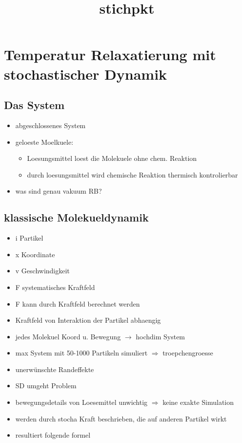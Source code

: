 \documentclass[]{article}
\title{stichpkt}
\begin{document}
\section{Temperatur Relaxatierung mit stochastischer Dynamik}

\subsection{Das System}
\begin{itemize}
	\item abgeschlossenes System
	\item geloeste Moelkuele: 
	\begin{itemize}
		\item Loesungsmittel loest die Molekuele ohne chem. Reaktion
		\item durch loesungsmittel wird chemische Reaktion thermisch kontrolierbar
	\end{itemize}	
	\item was sind genau vakuum RB? %
\end{itemize}

\subsection{klassische Molekueldynamik}
\begin{itemize}
	\item i Partikel
	\item x Koordinate 
	\item v Geschwindigkeit
	\item F systematisches Kraftfeld
	\item F kann durch Kraftfeld berechnet werden
	\item Kraftfeld von Interaktion der Partikel abhaengig
	\item jedes Molekuel Koord u. Bewegung $\rightarrow$ hochdim System 
	\item max System mit 50-1000 Partikeln simuliert $\Rightarrow $ troepchengroesse
	\item unerwünschte Randeffekte
	\item SD umgeht Problem
	\item bewegungsdetails von Loesemittel unwichtig $\Rightarrow$ keine exakte Simulation
	\item werden durch stocha Kraft beschrieben, die auf anderen Partikel wirkt	
	\item resultiert folgende formel
\end{itemize}
\end{document}
